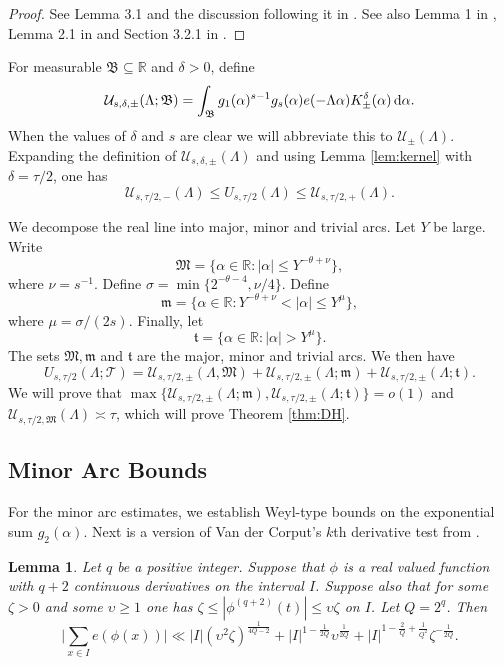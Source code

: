 \documentclass[11pt,reqno]{amsart}
\numberwithin{equation}{section}
\newtheorem{lemma}{Lemma}[section]
\renewcommand{\d}{\,{\rm d}}
\begin{document}
\begin{proof} See Lemma 3.1 and the discussion following it in \cite{Bharloc}. See also Lemma 1 in \cite{FreemanAsymp}, Lemma 2.1 in \cite{Poulias1} and Section 3.2.1 in \cite{Poulthesis}. 
\end{proof}

For measurable $\mathfrak{B} \subseteq \mathbb{R}$ and $\delta > 0$, define 
\[ \mathcal{U}_{s,\delta,\pm}(\Lambda; \mathfrak{B}) = \int_{\mathfrak{B}} g_1(\alpha)^{s-1}g_s(\alpha)e(-\Lambda\alpha)K^{\delta}_{\pm}(\alpha)\d\alpha. \]
When the values of $\delta$ and $s$ are clear we will abbreviate this to $\mathcal{U}_{\pm}(\Lambda)$. Expanding the definition of $\mathcal{U}_{s,\delta,\pm}(\Lambda)$ and using Lemma \ref{lem:kernel} with $\delta = \tau/2$, one has 
\[ \mathcal{U}_{s,\tau/2,-}(\Lambda) \leq U_{s,\tau/2}(\Lambda) \leq \mathcal{U}_{s,\tau/2,+}(\Lambda). \]

We decompose the real line into major, minor and trivial arcs. Let $Y$ be large. Write 
\[ \mathfrak{M} = \{ \alpha \in \mathbb{R}: |\alpha| \leq Y^{-\theta+\nu} \}, \]
where $\nu = s^{-1}$. Define $\sigma = \min\{2^{-\theta-4},\nu/4 \}$. Define 
\[ \mathfrak{m} = \{ \alpha \in \mathbb{R}: Y^{-\theta+\nu} < |\alpha| \leq Y^{\mu} \}, \]
where $\mu = \sigma/(2s)$. Finally, let 
\[ \mathfrak{t} = \{ \alpha \in \mathbb{R}: |\alpha|>Y^{\mu} \}. \]
The sets $\mathfrak{M}, \mathfrak{m}$ and $\mathfrak{t}$ are the major, minor and trivial arcs. We then have 
\[U_{s,\tau/2}(\Lambda;\mathcal{T}) = \mathcal{U}_{s,\tau/2,\pm}(\Lambda,\mathfrak{M})+\mathcal{U}_{s,\tau/2,\pm}(\Lambda;\mathfrak{m})+\mathcal{U}_{s,\tau/2,\pm}(\Lambda;\mathfrak{t}). \] 
We will prove that $\max\{\mathcal{U}_{s,\tau/2,\pm}(\Lambda;\mathfrak{m}),\mathcal{U}_{s,\tau/2,\pm}(\Lambda;\mathfrak{t})\}=o(1)$ and $\mathcal{U}_{s,\tau/2,\mathfrak{M}}(\Lambda) \asymp \tau$, which will prove Theorem \ref{thm:DH}. 


\subsection{Minor Arc Bounds} 
For the minor arc estimates, we establish Weyl-type bounds on the exponential sum $g_2(\alpha)$. Next is a version of Van der Corput's $k$th derivative test from \cite{GraKol}. 

\begin{lemma} \label{lem:grakol}
Let $q$ be a positive integer. Suppose that $\phi$ is a real valued function with $q+2$ continuous derivatives on the interval $I$. Suppose also that for some $\zeta > 0$ and some $\upsilon \geq 1$ one has $\zeta \leq |\phi^{(q+2)}(t)| \leq \upsilon \zeta$ on $I$. Let $Q = 2^q$. Then 
\[ \big| \sum_{x \in I} e(\phi(x)) \big| \ll |I|(\upsilon^2\zeta)^{\frac{1}{4Q-2}}+|I|^{1-\frac{1}{2Q}}\upsilon^{\frac{1}{2Q}}+|I|^{1-\frac{2}{Q}+\frac{1}{Q^2}}\zeta^{-\frac{1}{2Q}}. \]
\end{lemma}
\end{document}
